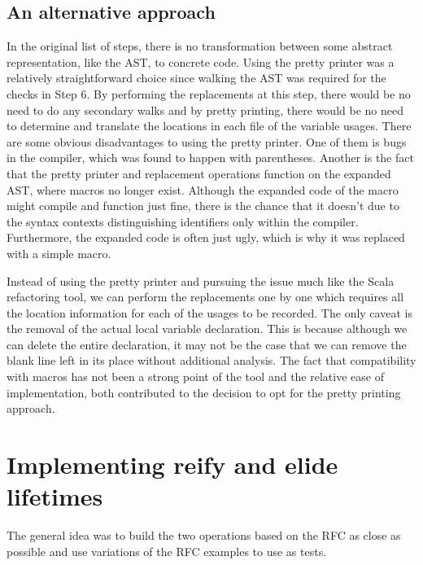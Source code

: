 \subsection{An alternative approach}
In the original list of steps, there is no transformation between some abstract representation, like the AST, to concrete code. Using the pretty printer was a relatively straightforward choice since walking the AST was required for the checks in Step 6. By performing the replacements at this step, there would be no need to do any secondary walks and by pretty printing, there would be no need to determine and translate the locations in each file of the variable usages. There are some obvious disadvantages to using the pretty printer. One of them is bugs in the compiler, which was found to happen with parentheses. Another is the fact that the pretty printer and replacement operations function on the expanded AST, where macros no longer exist. Although the expanded code of the macro might compile and function just fine, there is the chance that it doesn't due to the syntax contexts distinguishing identifiers only within the compiler. Furthermore, the expanded code is often just ugly, which is why it was replaced with a simple macro.

Instead of using the pretty printer and pursuing the issue much like the Scala refactoring tool, we can perform the replacements one by one which requires all the location information for each of the usages to be recorded. The only caveat is the removal of the actual local variable declaration. This is because although we can delete the entire declaration, it may not be the case that we can remove the blank line left in its place without additional analysis. The fact that compatibility with macros has not been a strong point of the tool and the relative ease of implementation, both contributed to the decision to opt for the pretty printing approach.

\section{Implementing reify and elide lifetimes}\label{S:lifetimeref}
The general idea was to build the two operations based on the RFC as close as possible and use variations of the RFC examples to use as tests.

